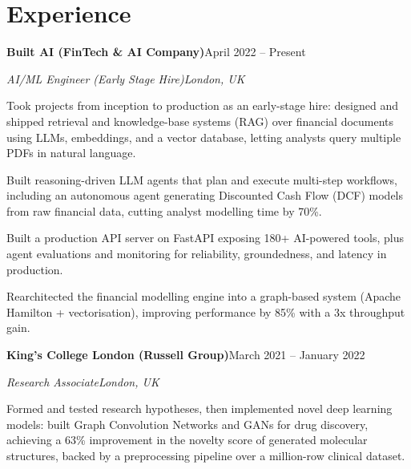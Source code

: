 \documentclass[10pt,a4paper]{article}
\newcommand{\entry}[4]{%
  {\color{company}\bfseries #1}\hfill {\color{muted}#2}\par
  \vspace{1pt}
  {\itshape #3}\hfill {\color{muted}\itshape #4}\par
  \vspace{3pt}%
}
\begin{document}
\section{Experience}
\entry{Built AI (FinTech \& AI Company)}{April 2022 -- Present}{AI/ML Engineer (Early Stage Hire)}{London, UK}
\begin{tight}
  \item Took projects from inception to production as an early-stage hire: designed and shipped retrieval and knowledge-base systems (RAG) over financial documents using LLMs, embeddings, and a vector database, letting analysts query multiple PDFs in natural language.
  \item Built reasoning-driven LLM agents that plan and execute multi-step workflows, including an autonomous agent generating Discounted Cash Flow (DCF) models from raw financial data, cutting analyst modelling time by 70\%.
  \item Built a production API server on FastAPI exposing 180+ AI-powered tools, plus agent evaluations and monitoring for reliability, groundedness, and latency in production.
  \item Rearchitected the financial modelling engine into a graph-based system (Apache Hamilton + vectorisation), improving performance by 85\% with a 3x throughput gain.
\end{tight}

\entry{King's College London (Russell Group)}{March 2021 -- January 2022}{Research Associate}{London, UK}
\begin{tight}
  \item Formed and tested research hypotheses, then implemented novel deep learning models: built Graph Convolution Networks and GANs for drug discovery, achieving a 63\% improvement in the novelty score of generated molecular structures, backed by a preprocessing pipeline over a million-row clinical dataset.
\end{tight}

\end{document}
